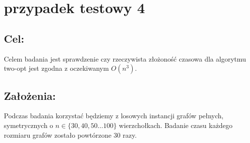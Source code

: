 \section{przypadek testowy 4}
\subsection{Cel: }
Celem badania jest sprawdzenie czy rzeczywista złożoność czasowa dla algorytmu two-opt jest zgodna z oczekiwanym \(O(n^3)\).
\subsection{Założenia: }
Podczas badania korzystać będziemy z losowych instancji grafów pełnych, symetrycznych o \(n \in \{ 30, 40, 50 \ldots 100 \}\) wierzchołkach. Badanie czasu każdego rozmiaru grafów zostało powtórzone 30 razy.

